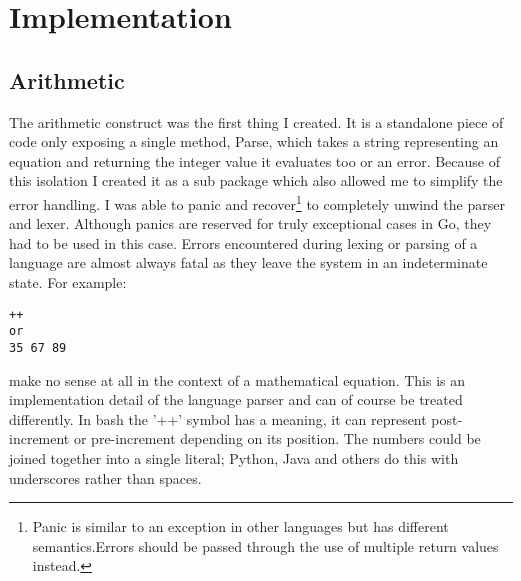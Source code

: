 \chapter{Implementation}




\section{Arithmetic}
The arithmetic construct was the first thing I created.
It is a standalone piece of code only exposing a single method, Parse, which takes a string representing an equation and returning the integer value it evaluates too or an error.
Because of this isolation I created it as a sub package which also allowed me to simplify the error handling.
I was able to panic and recover\footnote{Panic is similar to an exception in other languages but has different semantics.Errors should be passed through the use of multiple return values instead.} to completely unwind the parser and lexer.
Although panics are reserved for truly exceptional cases in Go, they had to be used in this case.
Errors encountered during lexing or parsing of a language are almost always fatal as they leave the system in an indeterminate state.
For example:
\begin{verbatim}
++
or
35 67 89
\end{verbatim}
make no sense at all in the context of a mathematical equation.
This is an implementation detail of the language parser and can of course be treated differently.
In bash the '++' symbol has a meaning, it can represent post-increment or pre-increment depending on its position.
The numbers could be joined together into a single literal; Python, Java and others do this with underscores rather than spaces\cite{UNDERSCORE-NUM-LITERAL}.

